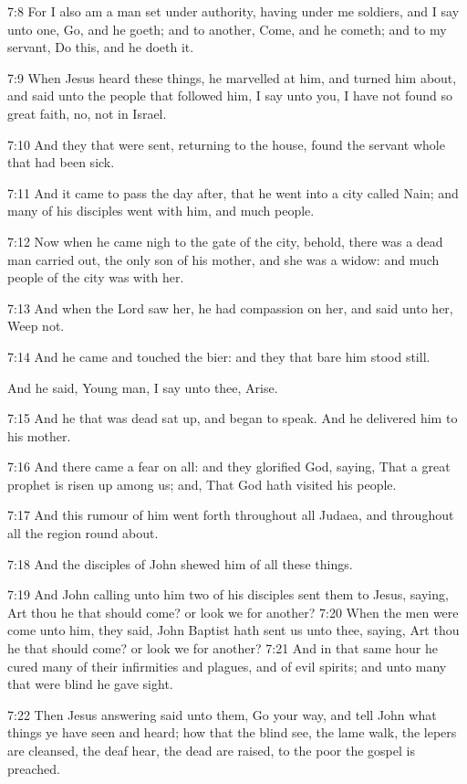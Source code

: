 7:8 For I also am a man set under authority, having under me soldiers, and I say unto one, Go, and he goeth; and to another, Come, and he cometh; and to my servant, Do this, and he doeth it.

7:9 When Jesus heard these things, he marvelled at him, and turned him about, and said unto the people that followed him, I say unto you, I have not found so great faith, no, not in Israel.

7:10 And they that were sent, returning to the house, found the servant whole that had been sick.

7:11 And it came to pass the day after, that he went into a city called Nain; and many of his disciples went with him, and much people.

7:12 Now when he came nigh to the gate of the city, behold, there was a dead man carried out, the only son of his mother, and she was a widow: and much people of the city was with her.

7:13 And when the Lord saw her, he had compassion on her, and said unto her, Weep not.

7:14 And he came and touched the bier: and they that bare him stood still.

And he said, Young man, I say unto thee, Arise.

7:15 And he that was dead sat up, and began to speak. And he delivered him to his mother.

7:16 And there came a fear on all: and they glorified God, saying, That a great prophet is risen up among us; and, That God hath visited his people.

7:17 And this rumour of him went forth throughout all Judaea, and throughout all the region round about.

7:18 And the disciples of John shewed him of all these things.

7:19 And John calling unto him two of his disciples sent them to Jesus, saying, Art thou he that should come? or look we for another?  7:20 When the men were come unto him, they said, John Baptist hath sent us unto thee, saying, Art thou he that should come? or look we for another?  7:21 And in that same hour he cured many of their infirmities and plagues, and of evil spirits; and unto many that were blind he gave sight.

7:22 Then Jesus answering said unto them, Go your way, and tell John what things ye have seen and heard; how that the blind see, the lame walk, the lepers are cleansed, the deaf hear, the dead are raised, to the poor the gospel is preached.

